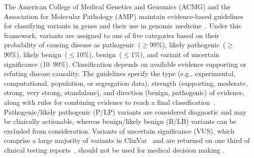 \documentclass[11pt]{article}
\theoremstyle{plain}
\begin{document}
The American College of Medical Genetics and Genomics (ACMG) and the Association for Molecular Pathology (AMP) maintain evidence-based guidelines for classifying variants in genes and their use in genomic medicine~\cite{richards2015standards}. Under this framework, variants are assigned to one of five categories based on their probability of causing disease as pathogenic~($\geq$99\%), likely pathogenic~($\geq$90\%), likely benign~($\leq$10\%), benign~($\leq$1\%), and variant of uncertain significance (10--90\%). Classification depends on available evidence supporting or refuting disease causality. The guidelines specify the type (e.g., experimental, computational, population, or segregation data), strength (supporting, moderate, strong, very strong, standalone), and direction (benign, pathogenic) of evidence, along with rules for combining evidence to reach a final classification~\cite{richards2015standards}. %
Pathogenic/likely pathogenic (P/LP) variants are considered diagnostic and may be clinically actionable, whereas benign/likely benign (B/LB) variants can be excluded from consideration. Variants of uncertain significance (VUS), which comprise a large majority of variants in ClinVar~\cite{landrum2018clinvar, mcewen2026multiplexed} and are returned on one third of clinical testing reports~\cite{rehm2023landscape}, should not be used for medical decision making \cite{rehm2015clingen}. %
\end{document}
